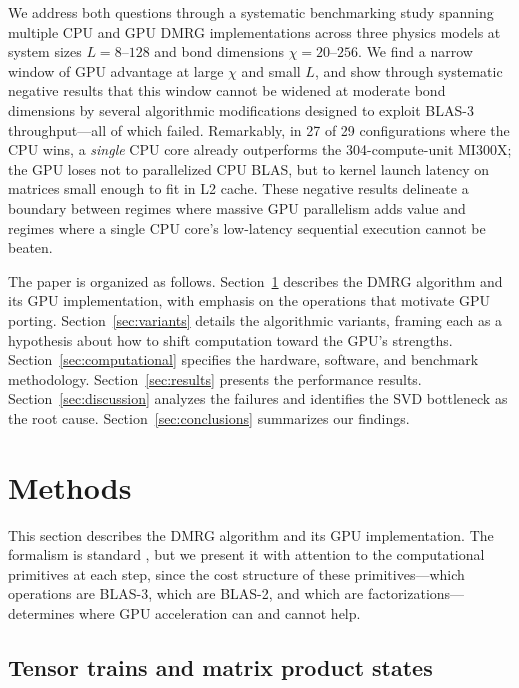 \documentclass[preprint,12pt]{elsarticle}
\begin{document}
We address both questions through a systematic benchmarking study spanning multiple CPU and GPU DMRG implementations across three physics models at system sizes $L = 8$--$128$ and bond dimensions $\chi = 20$--$256$.
We find a narrow window of GPU advantage at large $\chi$ and small $L$, and show through systematic negative results that this window cannot be widened at moderate bond dimensions by several algorithmic modifications designed to exploit BLAS-3 throughput---all of which failed.
Remarkably, in 27 of 29 configurations where the CPU wins, a \emph{single} CPU core already outperforms the 304-compute-unit MI300X; the GPU loses not to parallelized CPU BLAS, but to kernel launch latency on matrices small enough to fit in L2 cache.
These negative results delineate a boundary between regimes where massive GPU parallelism adds value and regimes where a single CPU core's low-latency sequential execution cannot be beaten.

The paper is organized as follows.
Section~\ref{sec:methods} describes the DMRG algorithm and its GPU implementation, with emphasis on the operations that motivate GPU porting.
Section~\ref{sec:variants} details the algorithmic variants, framing each as a hypothesis about how to shift computation toward the GPU's strengths.
Section~\ref{sec:computational} specifies the hardware, software, and benchmark methodology.
Section~\ref{sec:results} presents the performance results.
Section~\ref{sec:discussion} analyzes the failures and identifies the SVD bottleneck as the root cause.
Section~\ref{sec:conclusions} summarizes our findings.


\section{Methods}
\label{sec:methods}

This section describes the DMRG algorithm and its GPU implementation.
The formalism is standard \cite{Schollwoeck2011}, but we present it with attention to the computational primitives at each step, since the cost structure of these primitives---which operations are BLAS-3, which are BLAS-2, and which are factorizations---determines where GPU acceleration can and cannot help.

\subsection{Tensor trains and matrix product states}
\label{sec:mps}
\end{document}
